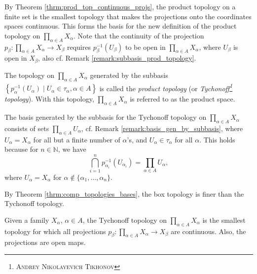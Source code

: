 \begin{remark}
	By Theorem \ref{thrm:prod_top_continuous_projs}, the product topology on a finite set is the smallest topology that makes the projections onto the coordinates spaces continuous. This forms the basis for the new definition of the product topology on $\prod_{\alpha\in A}X_{\alpha}$. Note that the continuity of the projection $p_{\beta}: \prod_{\alpha\in A}X_{\alpha}\to X_{\beta}$ requires $p_{\beta}^{-1}(U_{\beta})$ to be open in $\prod_{\alpha\in A}X_{\alpha}$, where $U_{\beta}$ is open in $X_{\beta}$, also cf. Remark \ref{remark:subbasis_prod_topology}.
\end{remark}

\begin{defn}
	The topology on $\prod_{\alpha\in A}X_{\alpha}$ generated by the subbasis $\left\{p_{\alpha}^{-1}(U_{\alpha})\mid U_{\alpha}\in\tau_{\alpha}, \alpha\in A\right\}$ is called the \textit{product topology} (or \textit{Tychonoff\footnote{\textsc{Andrey Nikolayevich Tikhonov}} topology}). With this topology, $\prod_{\alpha\in A}X_{\alpha}$ is referred to as the product space.
\end{defn}

\begin{remark}\label{remark:basis_tychonoff_topology}
	The basis generated by the subbasis for the Tychonoff topology on $\prod_{\alpha\in A}X_{\alpha}$ consists of sets $\prod_{\alpha\in A}U_{\alpha}$, cf. Remark \ref{remark:basis_gen_by_subbasis}, where $U_{\alpha} = X_{\alpha}$ for all but a finite number of $\alpha$'s, and $U_{\alpha}\in\tau_{\alpha}$ for all $\alpha$. This holds because for $n\in\mathbb N$, we have
	$$\bigcap_{i=1}^{n} p_{\alpha_i}^{-1}(U_{\alpha_i}) = \prod_{\alpha\in A}U_{\alpha},$$ where $U_{\alpha} = X_{\alpha}$ for $\alpha\notin \{\alpha_1, \dots, \alpha_n\}$.
\end{remark}

\begin{remark}
	By Theorem \ref{thrm:comp_topologies_bases}, the box topology is finer than the Tychonoff topology.
\end{remark}

\begin{theorem}
	Given a family $X_{\alpha}$, $\alpha\in A$, the Tychonoff topology on $\prod_{\alpha\in A}X_{\alpha}$ is the smallest topology for which all projections $p_{\beta}: \prod_{\alpha\in A}X_{\alpha}\to X_{\beta}$ are continuous. Also, the projections are open maps.
\end{theorem}

